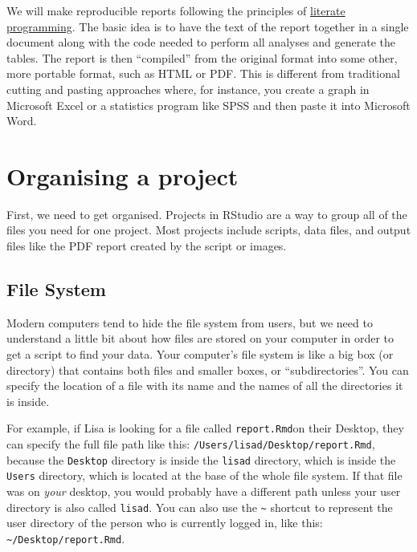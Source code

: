 \documentclass[
  oneside]{book}
\begin{document}
We will make reproducible reports following the principles of \href{https://en.wikipedia.org/wiki/Literate_programming}{literate programming}. The basic idea is to have the text of the report together in a single document along with the code needed to perform all analyses and generate the tables. The report is then ``compiled'' from the original format into some other, more portable format, such as HTML or PDF. This is different from traditional cutting and pasting approaches where, for instance, you create a graph in Microsoft Excel or a statistics program like SPSS and then paste it into Microsoft Word.

\hypertarget{projects}{%
\section{Organising a project}\label{projects}}

First, we need to get organised. Projects in RStudio are a way to group all of the files you need for one project. Most projects include scripts, data files, and output files like the PDF report created by the script or images.

\hypertarget{file-system}{%
\subsection{File System}\label{file-system}}

Modern computers tend to hide the file system from users, but we need to understand a little bit about how files are stored on your computer in order to get a script to find your data. Your computer's file system is like a big box (or directory) that contains both files and smaller boxes, or ``subdirectories''. You can specify the location of a file with its name and the names of all the directories it is inside.

For example, if Lisa is looking for a file called \texttt{report.Rmd}on their Desktop, they can specify the full file path like this: \texttt{/Users/lisad/Desktop/report.Rmd}, because the \texttt{Desktop} directory is inside the \texttt{lisad} directory, which is inside the \texttt{Users} directory, which is located at the base of the whole file system. If that file was on \emph{your} desktop, you would probably have a different path unless your user directory is also called \texttt{lisad}. You can also use the \texttt{\textasciitilde{}} shortcut to represent the user directory of the person who is currently logged in, like this: \texttt{\textasciitilde{}/Desktop/report.Rmd}.
\end{document}

